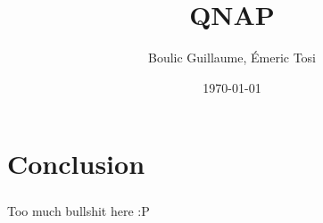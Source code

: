 \documentclass[a4paper,12pt]{report}
\title{QNAP}
\author{Boulic Guillaume, Émeric Tosi}
\date{\today}
\begin{document}
%
    \maketitle{} %
%

    \setcounter{tocdepth}{1} %
    \renewcommand{\contentsname}{Sommaire} %
    \tableofcontents{} %
    \clearpage
%
%
%
%

\clearpage
%
%

\clearpage
%
%
\chapter*{Conclusion}
        \paragraph{}
Too much bullshit here :P
    \clearpage
%
%

\clearpage
%
%
%
\end{document}
